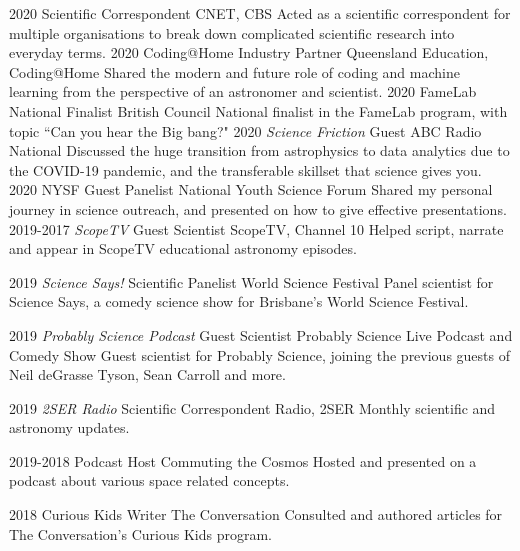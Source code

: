 \begin{entrylist}
\entry
    {2020}
    {Scientific Correspondent}
    {CNET, CBS}
    {Acted as a scientific correspondent for multiple organisations to break down complicated scientific research into everyday terms.}
\entry
	{2020}
	{Coding@Home Industry Partner}
	{Queensland Education, Coding@Home}
	{Shared the modern and future role of coding and machine learning from the perspective of an astronomer and scientist.}
\entry
    {2020}
    {FameLab National Finalist}
    {British Council}
    {National finalist in the FameLab program, with topic ``Can you hear the Big bang?"}
\entry
    {2020}
    {\textit{Science Friction} Guest}
    {ABC Radio National}
    {Discussed the huge transition from astrophysics to data analytics due to the COVID-19 pandemic, and the transferable skillset that science gives you.}
\entry
	{2020}
	{NYSF Guest Panelist}
	{National Youth Science Forum}
	{Shared my personal journey in science outreach, and presented on how to give effective presentations.}
\entry
	{2019-2017}
	{\textit{ScopeTV} Guest Scientist}
	{ScopeTV, Channel 10}
	{Helped script, narrate and appear in ScopeTV educational astronomy episodes.}
\end{entrylist}
\begin{entrylist}
\entry
	{2019}
	{\textit{Science Says!} Scientific Panelist}
	{World Science Festival}
	{Panel scientist for Science Says, a comedy science show for Brisbane's World Science Festival.}
\end{entrylist}
\begin{entrylist}
\entry
	{2019}
	{\textit{Probably Science Podcast }Guest Scientist}
	{Probably Science Live Podcast and Comedy Show}
	{Guest scientist for Probably Science, joining the previous guests of Neil deGrasse Tyson, Sean Carroll and more.}
\end{entrylist}
\begin{entrylist}
\entry
	{2019}
	{\textit{2SER Radio} Scientific Correspondent}
	{Radio, 2SER}
	{Monthly scientific and astronomy updates.}
\end{entrylist}
\begin{entrylist}
\entry
    {2019-2018}
    {Podcast Host}
    {Commuting the Cosmos}
    {Hosted and presented on a podcast about various space related concepts.}
\end{entrylist}
\begin{entrylist}
\entry
    {2018}
    {Curious Kids Writer}
    {The Conversation}
    {Consulted and authored articles for The Conversation's Curious Kids program.}
\end{entrylist}
